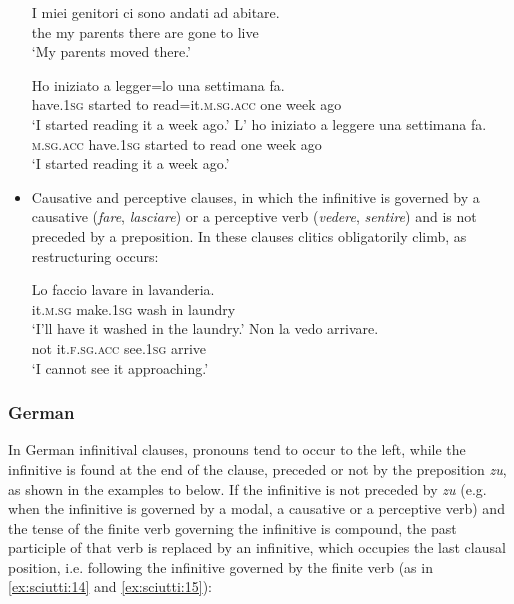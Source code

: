 \documentclass[output=paper,modfonts,nonflat,newtxmath]{langsci/langscibook}
\begin{document}
\begin{itemize}
\begin{xlist}
    \ex \label{ex:sciutti:6b}
    \gll I miei genitori ci sono andati ad abitare.\\
         the my  parents there are  gone  to live\\
    \glt  ‘My parents moved there.’
    \end{xlist}
\ex \label{ex:sciutti:7}
    \begin{xlist}
    \ex \label{ex:sciutti:7a}
    \gll Ho iniziato a legger=lo una settimana fa.\\
         have.\textsc{1sg} started to read=it.\textsc{m.sg.acc} one  week  ago\\
    \glt  ‘I started reading it a week ago.’
    \ex \label{ex:sciutti:7b}
    \gll L’ ho iniziato a leggere una settimana     fa.\\
         \textsc{m.sg.acc} have.\textsc{1sg} started to read one week ago\\
    \glt  ‘I started reading it a week ago.’
    \end{xlist}
\z

\item Causative and perceptive clauses, in which the infinitive is governed by a causative (\textit{fare}, \textit{lasciare}) or a perceptive verb (\textit{vedere}, \textit{sentire}) and is not preceded by a preposition. In these clauses clitics obligatorily climb, as restructuring occurs:

\ea \label{ex:sciutti:8}
    \gll Lo faccio lavare in lavanderia.\\
        it.\textsc{m.sg}   make.\textsc{1sg} wash in laundry\\
    \glt  ‘I’ll have it washed in the laundry.’
\ex \label{ex:sciutti:9}
    \gll Non la vedo arrivare.\\
       not it.\textsc{f.sg.acc}   see.\textsc{1sg} arrive\\
    \glt  ‘I cannot see it approaching.’
\z
\end{itemize}


\subsubsection{German}%

In German infinitival clauses, pronouns tend to occur to the left, while the infinitive is found at the end of the clause, preceded or not by the preposition \textit{zu}, as shown in the examples  to  below. If the infinitive is not preceded by \textit{zu} (e.g. when the infinitive is governed by a modal, a causative or a perceptive verb) and the tense of the finite verb governing the infinitive is compound, the past participle of that verb is replaced by an infinitive, which occupies the last clausal position, i.e. following the infinitive governed by the finite verb (as in \ref{ex:sciutti:14} and \ref{ex:sciutti:15}):
\end{document}
